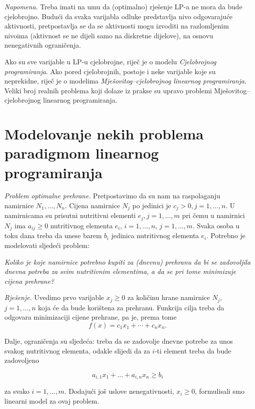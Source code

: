 \documentclass[a4paper, utf8, 11pt, colorlinks]{book}
\begin{document}
\textit{Napomena.} Treba imati na umu da (optimalno) rješenje LP-a ne mora da bude cjelobrojno. Budući da svaka varijabla odluke predstavlja nivo odgovarajuće aktivnosti, pretpostavlja se da se aktivnosti mogu izvoditi na razlomljenim nivoima (aktivnost  se ne dijeli samo na diskretne dijelove), na osnovu nenegativnih ograničenja.  

Ako su sve varijable u LP-u cjelobrojne, riječ je o modelu \emph{Cjelobrojnog programiranja}. Ako pored cjelobrojnih, postoje i neke varijable koje su neprekidne, riječ je o modelima \emph{Mješovitog--cjelobrojnog linearnog programiranja}. Veliki broj realnih problema koji dolaze iz prakse su upravo problemi Mješovitog--cjelobrojnog linearnog programiranja.

\section{Modelovanje nekih problema paradigmom linearnog programiranja}\label{sec:modeli_lp}

\emph{Problem optimalne prehrane.} Pretpostavimo da su nam na raspolaganju namirnice $N_1, \ldots, N_n$. Cijena namirnice $N_j$ po jedinici je $c_j>0, j = 1, \ldots, n$. U namirnicama su prisutni nutritivni elementi $e_j,j=1,\ldots,m$ pri čemu
u namirnici $N_j$ ima $a_{ij} \geq 0$ nutritivnog elementa $e_i$, $i = 1, \ldots, n$, $j = 1, \ldots, m$. Svaka osoba u toku dana treba da unese barem $b_i$
jedinica nutritivnog elementa $e_i$. Potrebno je modelovati
sljedeći problem: 

\emph{Koliko je koje namirnice potrebno kupiti za (dnevnu) prehranu da bi se zadovoljila dnevna
potreba za svim nutritivnim elementima, a da se pri tome minimizuje cijena prehrane?}
 
 \emph{Rješenje.}  Uvedimo prvo varijable $x_j \geq 0$ za količinu hrane namirnice $N_j$, $j = 1, \ldots, n$ koja će da bude korištena za prehranu. Funkcija cilja treba da odgovara minimizaciji cijene prehrane, pa je, prema tome 
 $$f(x) = c_1 x_1 + \cdots + c_n x_n.$$
 
 Dalje, ograničenja su sljedeća: treba da se zadovolje dnevne potrebe za unos svakog nutritivnog elementa, odakle slijedi da za $i$-ti element treba da bude zadovoljeno
 
 $$ a_{i,1} x_1 + \ldots + a_{i,n} x_n \geq b_i $$
 
 za svako $i=1,\ldots,m$. Dodajući još uslove nenegativnosti, $x_i \geq 0$, formulisali smo linearni model za ovaj problem.  
 
\end{document}
